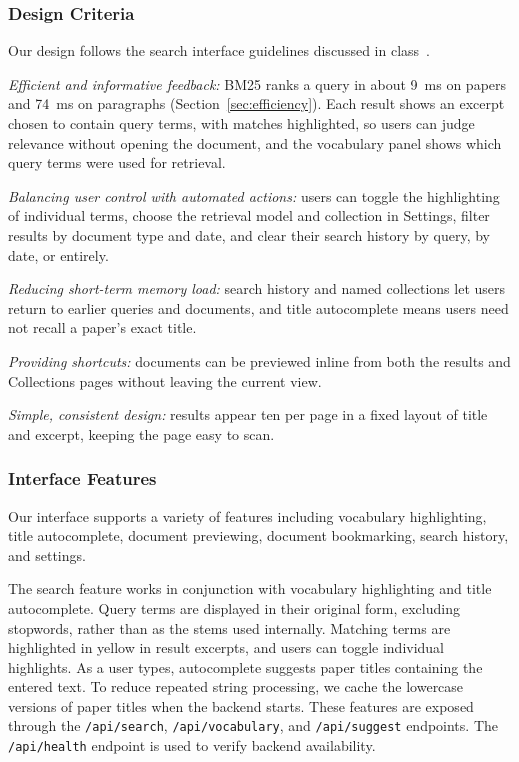 \documentclass[sigconf,nonacm]{acmart}
\begin{document}
\subsubsection{Design Criteria}
Our design follows the search interface guidelines discussed in
class~\cite{hearst2009search}.

\emph{Efficient and informative feedback:} BM25 ranks a query in about
9~ms on papers and 74~ms on paragraphs (Section~\ref{sec:efficiency}).
Each result shows an excerpt chosen to contain query terms, with matches
highlighted, so users can judge relevance without opening the document,
and the vocabulary panel shows which query terms were used for retrieval.

\emph{Balancing user control with automated actions:} users can toggle
the highlighting of individual terms, choose the retrieval model and
collection in Settings, filter results by document type and date, and
clear their search history by query, by date, or entirely.

\emph{Reducing short-term memory load:} search history and named
collections let users return to earlier queries and documents, and title
autocomplete means users need not recall a paper's exact title. 

\emph{Providing shortcuts:} documents can be previewed inline from both
the results and Collections pages without leaving the current view. 

\emph{Simple, consistent design:} results appear ten per page in a fixed
layout of title and excerpt, keeping the page easy to scan.

\subsubsection{Interface Features}
Our interface supports a variety of features including vocabulary highlighting, title autocomplete, 
document previewing, document bookmarking, search history, and settings.

The search feature works in conjunction with vocabulary highlighting and title autocomplete.
Query terms are displayed in their original form, excluding stopwords, rather than as the stems used internally.
Matching terms are highlighted in yellow in result excerpts, and users can toggle individual highlights. 
As a user types, autocomplete suggests paper titles containing the entered text. 
To reduce repeated string processing, we cache the lowercase versions of paper titles when the backend starts. 
These features are exposed through the \texttt{/api/search}, \texttt{/api/vocabulary}, and \texttt{/api/suggest} endpoints.
The \texttt{/api/health} endpoint is used to verify backend availability.
\end{document}
